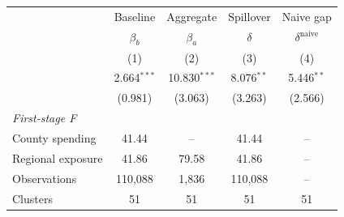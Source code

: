 \begin{tabular}{@{}lcccc@{}}
\toprule
 & Baseline & Aggregate & Spillover & Naive gap \\
 & $\beta_b$ & $\beta_a$ & $\delta$ & $\delta^{\mathrm{naive}}$ \\
 & (1) & (2) & (3) & (4) \\
\midrule
 & 2.664$^{***}$ & 10.830$^{***}$ & 8.076$^{**}$ & 5.446$^{**}$ \\
 & (0.981) & (3.063) & (3.263) & (2.566) \\
\addlinespace[12pt]
\textit{First-stage F} &  &  &  &  \\
\hspace{1em}County spending & 41.44 & -- & 41.44 & -- \\
\hspace{1em}Regional exposure & 41.86 & 79.58 & 41.86 & -- \\
\addlinespace[12pt]
Observations & 110,088 & 1,836 & 110,088 & -- \\
Clusters & 51 & 51 & 51 & 51 \\
\bottomrule\end{tabular}
